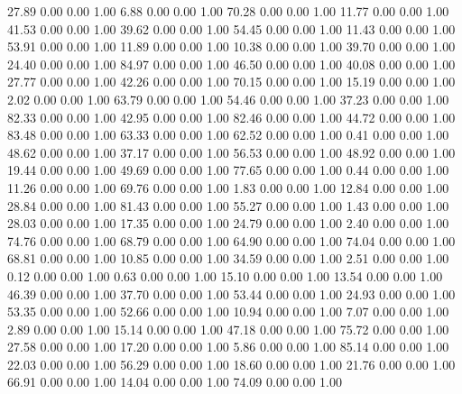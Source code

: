    27.89   0.00   0.00   1.00
    6.88   0.00   0.00   1.00
   70.28   0.00   0.00   1.00
   11.77   0.00   0.00   1.00
   41.53   0.00   0.00   1.00
   39.62   0.00   0.00   1.00
   54.45   0.00   0.00   1.00
   11.43   0.00   0.00   1.00
   53.91   0.00   0.00   1.00
   11.89   0.00   0.00   1.00
   10.38   0.00   0.00   1.00
   39.70   0.00   0.00   1.00
   24.40   0.00   0.00   1.00
   84.97   0.00   0.00   1.00
   46.50   0.00   0.00   1.00
   40.08   0.00   0.00   1.00
   27.77   0.00   0.00   1.00
   42.26   0.00   0.00   1.00
   70.15   0.00   0.00   1.00
   15.19   0.00   0.00   1.00
    2.02   0.00   0.00   1.00
   63.79   0.00   0.00   1.00
   54.46   0.00   0.00   1.00
   37.23   0.00   0.00   1.00
   82.33   0.00   0.00   1.00
   42.95   0.00   0.00   1.00
   82.46   0.00   0.00   1.00
   44.72   0.00   0.00   1.00
   83.48   0.00   0.00   1.00
   63.33   0.00   0.00   1.00
   62.52   0.00   0.00   1.00
    0.41   0.00   0.00   1.00
   48.62   0.00   0.00   1.00
   37.17   0.00   0.00   1.00
   56.53   0.00   0.00   1.00
   48.92   0.00   0.00   1.00
   19.44   0.00   0.00   1.00
   49.69   0.00   0.00   1.00
   77.65   0.00   0.00   1.00
    0.44   0.00   0.00   1.00
   11.26   0.00   0.00   1.00
   69.76   0.00   0.00   1.00
    1.83   0.00   0.00   1.00
   12.84   0.00   0.00   1.00
   28.84   0.00   0.00   1.00
   81.43   0.00   0.00   1.00
   55.27   0.00   0.00   1.00
    1.43   0.00   0.00   1.00
   28.03   0.00   0.00   1.00
   17.35   0.00   0.00   1.00
   24.79   0.00   0.00   1.00
    2.40   0.00   0.00   1.00
   74.76   0.00   0.00   1.00
   68.79   0.00   0.00   1.00
   64.90   0.00   0.00   1.00
   74.04   0.00   0.00   1.00
   68.81   0.00   0.00   1.00
   10.85   0.00   0.00   1.00
   34.59   0.00   0.00   1.00
    2.51   0.00   0.00   1.00
    0.12   0.00   0.00   1.00
    0.63   0.00   0.00   1.00
   15.10   0.00   0.00   1.00
   13.54   0.00   0.00   1.00
   46.39   0.00   0.00   1.00
   37.70   0.00   0.00   1.00
   53.44   0.00   0.00   1.00
   24.93   0.00   0.00   1.00
   53.35   0.00   0.00   1.00
   52.66   0.00   0.00   1.00
   10.94   0.00   0.00   1.00
    7.07   0.00   0.00   1.00
    2.89   0.00   0.00   1.00
   15.14   0.00   0.00   1.00
   47.18   0.00   0.00   1.00
   75.72   0.00   0.00   1.00
   27.58   0.00   0.00   1.00
   17.20   0.00   0.00   1.00
    5.86   0.00   0.00   1.00
   85.14   0.00   0.00   1.00
   22.03   0.00   0.00   1.00
   56.29   0.00   0.00   1.00
   18.60   0.00   0.00   1.00
   21.76   0.00   0.00   1.00
   66.91   0.00   0.00   1.00
   14.04   0.00   0.00   1.00
   74.09   0.00   0.00   1.00
